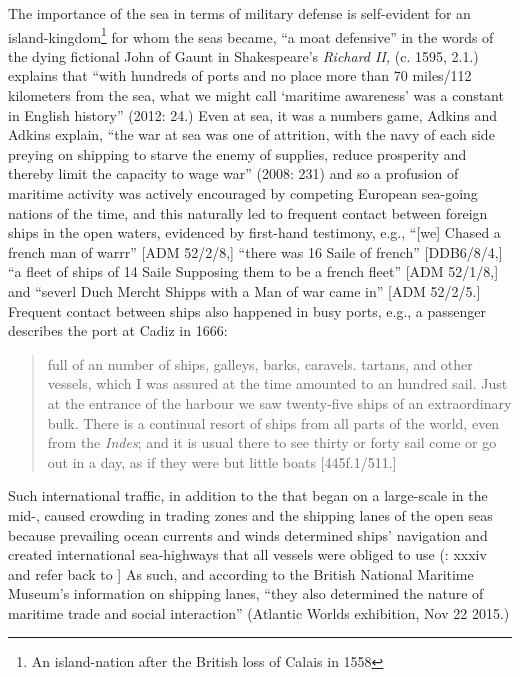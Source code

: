 The importance of the sea in terms of military defense is self-evident for an island-kingdom\footnote{An island-nation after the British loss of Calais in 1558} for whom the seas became, “a moat defensive” in the words of the dying fictional John of Gaunt in Shakespeare’s \textit{Richard II,} (c. 1595, 2.1.) \citeauthor{Bicheno2012} explains that “with hundreds of ports and no place more than 70 miles/112 kilometers from the sea, what we might call ‘maritime awareness’ was a constant in English history” (2012: 24.) Even at sea, it was a numbers game, Adkins and Adkins explain, “the war at sea was one of attrition, with the navy of each side preying on  shipping to starve the enemy of supplies, reduce prosperity and thereby limit the capacity to wage war” (2008: 231) and so a profusion of maritime activity was actively encouraged by competing European sea-going nations of the time, and this naturally led to frequent contact between foreign ships in the open waters, evidenced by first-hand testimony, e.g., “[we] Chased a french man of warrr” [ADM 52/2/8,] “there was 16 Saile of french” [DDB6/8/4,] “a fleet of ships of 14 Saile Supposing them to be a french fleet” [ADM 52/1/8,] and “severl Duch Mercht Shipps with a Man of war came in” [ADM 52/2/5.] Frequent contact between ships also happened in busy ports, e.g., a passenger describes the port at Cadiz in 1666:

\begin{quotation}
full of an  number of ships, galleys, barks, caravels. tartans, and other vessels, which I was assured at the time amounted to an hundred sail. Just at the entrance of the harbour we saw twenty-five ships of an extraordinary bulk. There is a continual resort of ships from all parts of the world, even from the \textit{Indes}; and it is usual there to see thirty or forty sail come or go out in a day, as if they were but little boats [445f.1/511.] 
\end{quotation}

Such international traffic, in addition to the   that began on a large-scale in the mid-, caused crowding in trading zones and the shipping lanes of the open seas because prevailing ocean currents and winds determined ships’ navigation and created international sea-highways that all vessels were obliged to use (\citealt{AdkinsAdkins2008}: xxxiv and refer back to ] As such, and according to the British National Maritime Museum’s information on shipping lanes, “they also determined the nature of maritime trade and social interaction” (Atlantic Worlds exhibition, Nov 22 2015.)  

